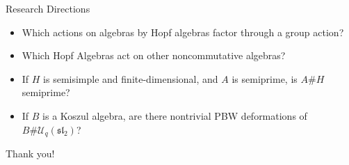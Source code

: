 \documentclass{beamer}
\newcommand\1{_{(1)}}
\newcommand\2{_{(2)}}
\begin{document}
\begin{frame}{Research Directions}
    \begin{itemize}
    \setlength{\itemsep}{2ex}
        \item<1-> Which actions on algebras by Hopf algebras factor through a group action?
        \item<2-> Which Hopf Algebras act on other noncommutative algebras?
        \item<3-> If $H$ is semisimple and finite-dimensional, and $A$ is semiprime, is $A\#H$ semiprime?
        \item<4-> If $B$ is a Koszul algebra, are there nontrivial PBW deformations of $B\# \mathcal{U}_q(\mathfrak{sl_2})$?
    \end{itemize}
\end{frame}

\begin{frame}

    \begin{center}
    {\Huge Thank you!}
    \end{center}
    
\end{frame}
\end{document}
